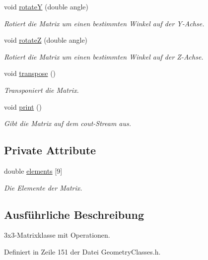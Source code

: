 \begin{DoxyCompactItemize}
void \hyperlink{classMatrix3D_a649e1aa65466df65d63f1aef934e5fad}{rotate\-Y} (double angle)
\begin{DoxyCompactList}\small\item\em Rotiert die Matrix um einen bestimmten Winkel auf der Y-\/\-Achse. \end{DoxyCompactList}\item 
void \hyperlink{classMatrix3D_ad1933b95fb776dd31ad1b81d3515b029}{rotate\-Z} (double angle)
\begin{DoxyCompactList}\small\item\em Rotiert die Matrix um einen bestimmten Winkel auf der Z-\/\-Achse. \end{DoxyCompactList}\item 
void \hyperlink{classMatrix3D_a0d59cb6ea927264477a10b9d427966d6}{transpose} ()
\begin{DoxyCompactList}\small\item\em Transponiert die Matrix. \end{DoxyCompactList}\item 
void \hyperlink{classMatrix3D_a33c771d35de761fafc619773e1b253c5}{print} ()
\begin{DoxyCompactList}\small\item\em Gibt die Matrix auf dem cout-\/\-Stream aus. \end{DoxyCompactList}\end{DoxyCompactItemize}
\subsection*{Private Attribute}
\begin{DoxyCompactItemize}
\item 
double \hyperlink{classMatrix3D_aa24b85b09060684ec1559f22857ccfee}{elements} \mbox{[}9\mbox{]}
\begin{DoxyCompactList}\small\item\em Die Elemente der Matrix. \end{DoxyCompactList}\end{DoxyCompactItemize}


\subsection{Ausführliche Beschreibung}
3x3-\/\-Matrixklasse mit Operationen. 

Definiert in Zeile 151 der Datei Geometry\-Classes.\-h.



